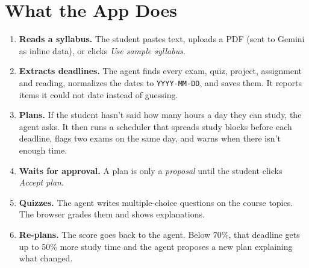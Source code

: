 \documentclass[11pt]{article}
\begin{document}
\section{What the App Does}
\begin{enumerate}
  \item \textbf{Reads a syllabus.} The student pastes text, uploads a PDF (sent to Gemini as
        inline data), or clicks \emph{Use sample syllabus}.
  \item \textbf{Extracts deadlines.} The agent finds every exam, quiz, project, assignment and
        reading, normalizes the dates to \texttt{YYYY-MM-DD}, and saves them. It reports items
        it could not date instead of guessing.
  \item \textbf{Plans.} If the student hasn't said how many hours a day they can study, the
        agent asks. It then runs a scheduler that spreads study blocks before each deadline,
        flags two exams on the same day, and warns when there isn't enough time.
  \item \textbf{Waits for approval.} A plan is only a \emph{proposal} until the student clicks
        \emph{Accept plan}.
  \item \textbf{Quizzes.} The agent writes multiple-choice questions on the course topics. The
        browser grades them and shows explanations.
  \item \textbf{Re-plans.} The score goes back to the agent. Below 70\%, that deadline gets up
        to 50\% more study time and the agent proposes a new plan explaining what changed.
\end{enumerate}
\end{document}
